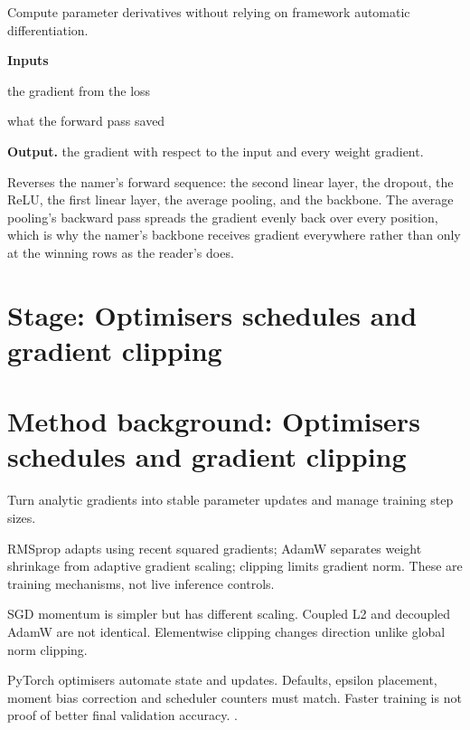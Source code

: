 Compute parameter derivatives without relying on framework automatic differentiation.




\noindent\textbf{Inputs}
\begin{description}[leftmargin=2.2em,style=nextline,font=\normalfont\ttfamily]\setlength\itemsep{1pt}
  \item[{dLogits}] \normalfont the gradient from the loss
  \item[{cache}] \normalfont what the forward pass saved
\end{description}

\noindent\textbf{Output.} the gradient with respect to the input and every weight gradient.


Reverses the namer's forward sequence: the second linear layer, the dropout, the ReLU, the first linear layer, the average pooling, and the backbone. The average pooling's backward pass spreads the gradient evenly back over every position, which is why the namer's backbone receives gradient everywhere rather than only at the winning rows as the reader's does.



\section*{Stage: Optimisers schedules and gradient clipping}
\section{Method background: Optimisers schedules and gradient clipping}\label{method:optim}
Turn analytic gradients into stable parameter updates and manage training step sizes.


RMSprop adapts using recent squared gradients; AdamW separates weight shrinkage from adaptive gradient scaling; clipping limits gradient norm. These are training mechanisms, not live inference controls.


SGD momentum is simpler but has different scaling. Coupled L2 and decoupled AdamW are not identical. Elementwise clipping changes direction unlike global norm clipping.


PyTorch optimisers automate state and updates. Defaults, epsilon placement, moment bias correction and scheduler counters must match. Faster training is not proof of better final validation accuracy. \cite{kingma2015,loshchilov2019,pascanu2013,rmslecture}.



